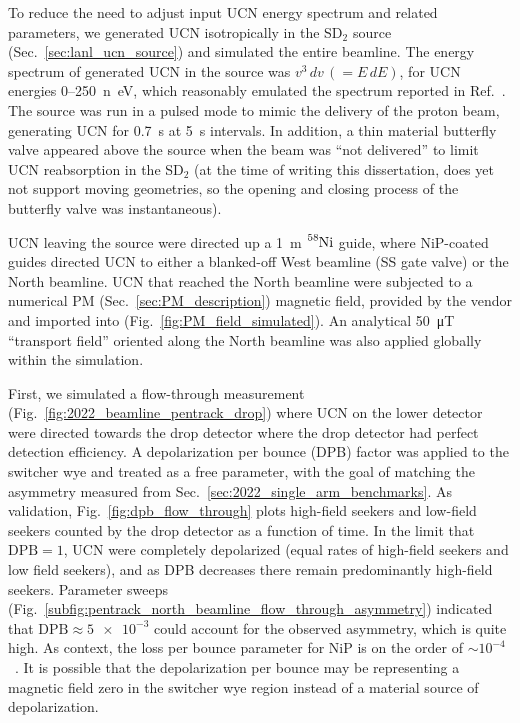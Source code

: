 To reduce the need to adjust input UCN energy spectrum and related parameters, we generated UCN isotropically in the SD$_2$ source (Sec.~\ref{sec:lanl_ucn_source}) and simulated the entire beamline. The energy spectrum of generated UCN in the source was $v^3\,dv\,(=E\,dE)$, for UCN energies 0--\qty{250}{n\eV}, which reasonably emulated the spectrum reported in Ref.~\cite{saunders_performance_2013}. The source was run in a pulsed mode to mimic the delivery of the proton beam, generating UCN for \qty{0.7}{s} at \qty{5}{s} intervals. In addition, a thin material butterfly valve appeared above the source when the beam was ``not delivered'' to limit UCN reabsorption in the SD$_2$ (at the time of writing this dissertation, \pentrack does yet not support moving geometries, so the opening and closing process of the butterfly valve was instantaneous).

UCN leaving the source were directed up a \qty{1}{m} $\ce{^{58}Ni}$ guide, where NiP-coated guides directed UCN to either a blanked-off West beamline (SS gate valve) or the North beamline. UCN that reached the North beamline were subjected to a numerical PM (Sec.~\ref{sec:PM_description}) magnetic field, provided by the vendor and imported into \pentrack (Fig.~\ref{fig:PM_field_simulated}). An analytical \qty{50}{\micro T} ``transport field'' oriented along the North beamline was also applied globally within the simulation.

First, we simulated a flow-through measurement (Fig.~\ref{fig:2022_beamline_pentrack_drop}) where UCN on the lower detector were directed towards the drop detector where the drop detector had perfect detection efficiency. A depolarization per bounce (DPB) factor was applied to the switcher wye and treated as a free parameter, with the goal of matching the asymmetry measured from Sec.~\ref{sec:2022_single_arm_benchmarks}. As validation, Fig.~\ref{fig:dpb_flow_through} plots high-field seekers and low-field seekers counted by the drop detector as a function of time. In the limit that $\text{DPB}=1$, UCN were completely depolarized (equal rates of high-field seekers and low field seekers), and as DPB decreases there remain predominantly high-field seekers. Parameter sweeps (Fig.~\ref{subfig:pentrack_north_beamline_flow_through_asymmetry}) indicated that $\text{DPB}\approx \num{5e-3}$ could account for the observed asymmetry, which is quite high. As context, the loss per bounce parameter for NiP is on the order of $\sim 10^{-4}$~\cite{pattie_jr_evaluation_2017}. It is possible that the depolarization per bounce may be representing a magnetic field zero in the switcher wye region instead of a material source of depolarization.

